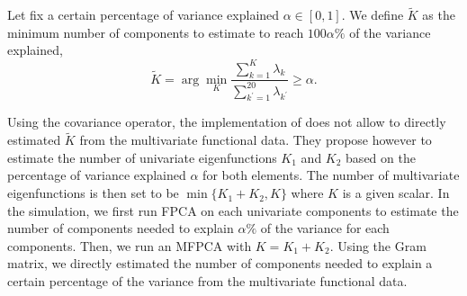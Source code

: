 Let fix a certain percentage of variance explained $\alpha \in [0, 1]$. We define $\widetilde{K}$ as the minimum number of components to estimate to reach $100\alpha\%$ of the variance explained,
\begin{equation}
    \widetilde{K} = \arg\min_K \frac{\sum_{k = 1}^K \lambda_k}{\sum_{k^\prime = 1}^{20} \lambda_{k^\prime}} \geq \alpha.
\end{equation}

Using the covariance operator, the implementation of \cite{happMultivariateFunctionalPrincipal2015} does not allow to directly estimated $\widetilde{K}$ from the multivariate functional data. They propose however to estimate the number of univariate eigenfunctions $K_1$ and $K_2$ based on the percentage of variance explained $\alpha$ for both elements. The number of multivariate eigenfunctions is then set to be $\min\{K_1 + K_2, K\}$ where $K$ is a given scalar. In the simulation, we first run FPCA on each univariate components to estimate the number of components needed to explain $\alpha\%$ of the variance for each components. Then, we run an MFPCA with $K = K_1 + K_2$. Using the Gram matrix, we directly estimated the number of components needed to explain a certain percentage of the variance from the multivariate functional data.


